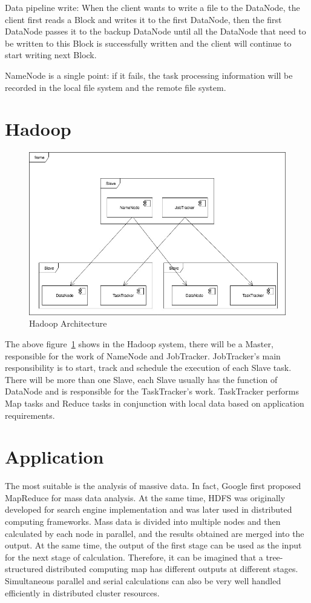 Data pipeline write: When the client wants to write a file to the DataNode, the client first reads a Block and writes it to the first DataNode, then the first DataNode passes it to the backup DataNode until all the DataNode that need to be written to this Block is successfully written and the client will continue to start writing next Block.


NameNode is a single point: if it fails, the task processing information will be recorded in the local file system and the remote file system.

\section{Hadoop}
\begin{figure}[!ht]
  \centering\includegraphics[width=\columnwidth]{../images/hadoop.jpg}
  \caption{Hadoop Architecture }\label{f:hadoop}
\end{figure}


The above figure~\ref{f:hadoop} shows in the Hadoop system, there will be a Master, responsible for the work of NameNode and JobTracker. JobTracker's main responsibility is to start, track and schedule the execution of each Slave task. There will be more than one Slave, each Slave usually has the function of DataNode and is responsible for the TaskTracker's work. TaskTracker performs Map tasks and Reduce tasks in conjunction with local data based on application requirements.

\section{Application}
The most suitable is the analysis of massive data. In fact, Google first proposed MapReduce for mass data analysis. At the same time, HDFS was originally developed for search engine implementation and was later used in distributed computing frameworks. Mass data is divided into multiple nodes and then calculated by each node in parallel, and the results obtained are merged into the output. At the same time, the output of the first stage can be used as the input for the next stage of calculation. Therefore, it can be imagined that a tree-structured distributed computing map has different outputs at different stages. Simultaneous parallel and serial calculations can also be very well handled efficiently in distributed cluster resources.


